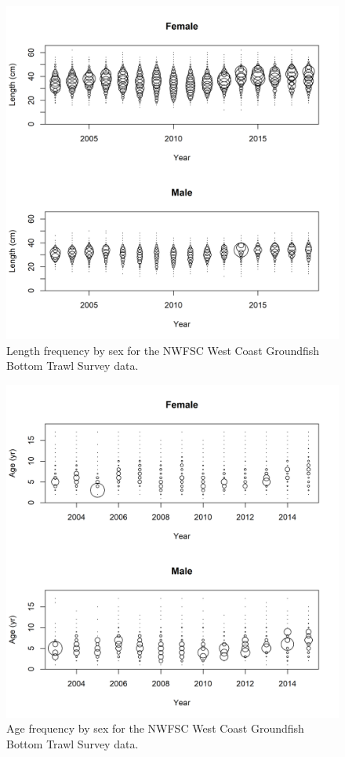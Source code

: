 \documentclass[12pt,]{article}
\begin{document}
\FloatBarrier

\begin{figure}
\centering
\includegraphics{Figures/NWFSC Groundfish Bottom Trawl Survey_Length_Frequency.png}
\caption{Length frequency by sex for the NWFSC West Coast Groundfish
Bottom Trawl Survey data. \label{fig:nw_len_freq}}
\end{figure}

\FloatBarrier

\begin{figure}
\centering
\includegraphics{Figures/NWFSC Groundfish Bottom Trawl Survey_Age_Frequency.png}
\caption{Age frequency by sex for the NWFSC West Coast Groundfish Bottom
Trawl Survey data. \label{fig:nw_age_freq}}
\end{figure}
\end{document}
